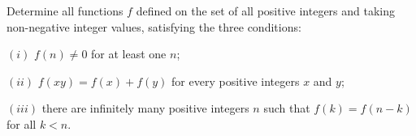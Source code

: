 Determine all functions $f$ defined on the set of all positive integers and taking non-negative integer values, satisfying the three conditions:

$(i)$ $f(n) \neq 0$ for at least one $n$;

$(ii)$ $f(xy) = f(x) + f(y)$ for every positive integers $x$ and $y$;

$(iii)$ there are infinitely many positive integers $n$ such that $f(k) = f(n-k)$ for all $k < n$.
